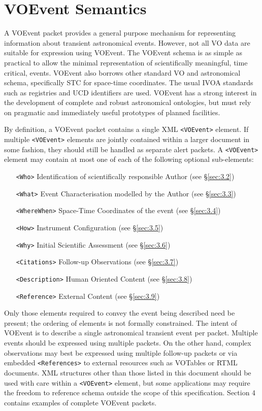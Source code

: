 \documentclass[11pt,a4paper]{ivoa}
\begin{document}
\section{VOEvent Semantics}
\label{sec:3}
A VOEvent packet provides a general purpose mechanism for representing information about transient astronomical events. However, not all VO data are suitable for expression using VOEvent. The VOEvent schema \citep{2011ivoa.spec.0711S} is as simple as practical to allow the minimal representation of scientifically meaningful, time critical, events. VOEvent also borrows other standard VO and astronomical schema, specifically STC for space-time coordinates. The usual IVOA standards such as registries and UCD identifiers are used. VOEvent has a strong interest in the development of complete and robust astronomical ontologies, but must rely on pragmatic and immediately useful prototypes of planned facilities. 

By definition, a VOEvent packet contains a single XML {\tt <VOEvent>} element. If multiple {\tt <VOEvent>} elements are jointly contained within a larger document in some fashion, they should still be handled as separate alert packets. A {\tt <VOEvent>} element may contain at most one of each of the following optional sub-elements:
\begin{itemize}
\item[\tt <Who>] Identification of scientifically responsible Author (see \S\ref{sec:3.2})
\item[\tt <What>] Event Characterisation modelled by the Author (see \S\ref{sec:3.3})
\item[\tt <WhereWhen>] Space-Time Coordinates of the event (see \S\ref{sec:3.4})
\item[\tt <How>] Instrument Configuration (see \S\ref{sec:3.5})
\item[\tt <Why>] Initial Scientific Assessment (see \S\ref{sec:3.6})
\item[\tt <Citations>] Follow-up Observations (see \S\ref{sec:3.7})
\item[\tt <Description>] Human Oriented Content (see \S\ref{sec:3.8})
\item[\tt <Reference>] External Content (see \S\ref{sec:3.9})
\end{itemize}

Only those elements required to convey the event being described need be present; the ordering of elements is not formally constrained. The intent of VOEvent is to describe a single astronomical transient event per packet. Multiple events should be expressed using multiple packets. On the other hand, complex observations may best be expressed using multiple follow-up packets or via embedded {\tt <References>} to external resources such as VOTables or RTML documents. XML structures other than those listed in this document should be used with care within a {\tt <VOEvent>} element, but some applications may require the freedom to reference schema outside the scope of this specification. Section 4 contains examples of complete VOEvent packets. 
\end{document}
